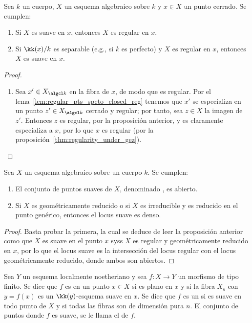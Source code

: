\begin{prop}
	Sea $k$ un cuerpo, $X$ un esquema algebraico sobre $k$ y $x \in X$ un punto cerrado. Se cumplen:
	\begin{enumerate}
		\item Si $X$ es suave en $x$, entonces $X$ es regular en $x$.
		\item Si $\kk(x)/k$ es separable (e.g., si $k$ es perfecto) y $X$ es regular en $x$, entonces $X$ es suave en $x$.
	\end{enumerate}
\end{prop}
\begin{proof}
	\begin{enumerate}
		\item Sea $x' \in X_{\algcl k}$ en la fibra de $x$, de modo que es regular.
			Por el lema~\ref{lem:regular_pts_speto_closed_reg} tenemos que $x'$ se especializa en un punto $z' \in X_{\algcl k}$ cerrado y regular;
			por tanto, sea $z \in X$ la imagen de $z'$.
			Entonces $z$ es regular, por la proposición anterior, y es claramente especializa a $x$, por lo que $x$ es regular
			(por la proposición~\ref{thm:regularity_under_gez}).
			\qedhere
	\end{enumerate}
\end{proof}
\begin{cor}\label{thm:geometrically_red_is_generically_smooth}
	Sea $X$ un esquema algebraico sobre un cuerpo $k$. Se cumplen:
	\begin{enumerate}
		\item El conjunto de puntos suaves de $X$, denominado , es abierto.
		\item Si $X$ es geométricamente reducido o si $X$ es irreducible y es reducido en el punto genérico,
			entonces el locus suave es denso.
	\end{enumerate}
\end{cor}
\begin{proof}
	Basta probar la primera, la cual se deduce de leer la proposición anterior como que $X$ es suave en el punto $x$ syss
	$X$ es regular y geométricamente reducido en $x$, por lo que el locus suave es la intersección del locus regular
	con el locus geométricamente reducido, donde ambos son abiertos.
\end{proof}

\begin{mydef}
	Sea $Y$ un esquema localmente noetheriano y sea $f \colon X \to Y$ un morfismo de tipo finito.
	Se dice que $f$ es  en un punto $x \in X$ si es plano en $x$ y si la fibra $X_y$ con $y = f(x)$ es un
	$\kk(y)$-esquema suave en $x$.
	Se dice que $f$ es un  si es suave en todo punto de $X$ y
	si todas las fibras son de dimensión pura $n$.
	El conjunto de puntos donde $f$ es suave, se le llama el  de $f$.
\end{mydef}

